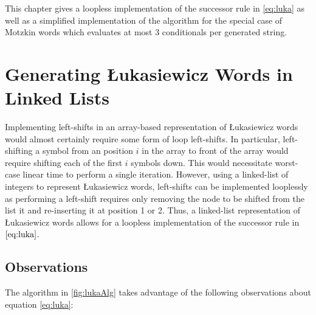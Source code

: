 This chapter gives a loopless implementation of the successor rule in \ref{eq:luka} as well as a simplified implementation of the algorithm for the special case of Motzkin words which evaluates at most 3 conditionals per generated string. 


\section{Generating Łukasiewicz Words in Linked Lists}
Implementing left-shifts in an array-based representation of Łukasiewicz words would almost certainly require some form of loop left-shifts.  In particular, left-shifting a symbol from an position $i$ in the array to front of the array would require shifting each of the first $i$ symbols down.  This would necessitate worst-case linear time to perform a single iteration. 
However, using a linked-list of integers to represent Łukasiewicz words, left-shifts can be implemented looplessly as performing a left-shift requires only removing the node to be shifted from the list it and re-inserting it at position 1 or 2.  Thus, a linked-list representation of Łukasiewicz words allows for a loopless implementation of the successor rule in $\ref{eq:luka}$.

\subsection{Observations}
The algorithm in \ref{fig:lukaAlg} takes advantage of the following observations about equation \ref{eq:luka}:

